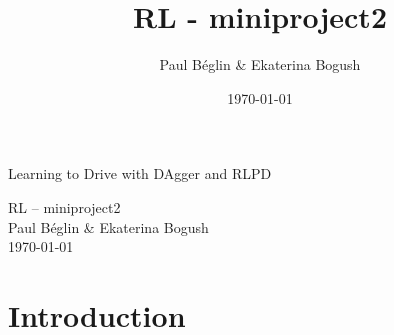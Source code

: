 \documentclass[a4paper]{article}
\title{RL - miniproject2}
\author{Paul Béglin \& Ekaterina Bogush}
\date{\today}
\begin{document}
\begin{center}
    {\LARGE Learning to Drive with DAgger and RLPD\par}
    \vspace{0.4em}
    {\Large RL -- miniproject2}\\[0.3em]
    {\normalsize Paul B\'eglin \& Ekaterina Bogush}\\[0.3em]
    {\normalsize \today}
\end{center}

\section{Introduction}


\end{document}
